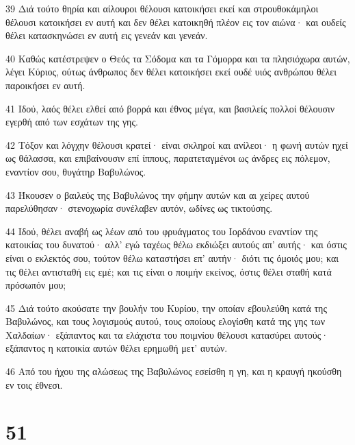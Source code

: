 \par 39 Διά τούτο θηρία και αίλουροι θέλουσι κατοικήσει εκεί και στρουθοκάμηλοι θέλουσι κατοικήσει εν αυτή και δεν θέλει κατοικηθή πλέον εις τον αιώνα· και ουδείς θέλει κατασκηνώσει εν αυτή εις γενεάν και γενεάν.
\par 40 Καθώς κατέστρεψεν ο Θεός τα Σόδομα και τα Γόμορρα και τα πλησιόχωρα αυτών, λέγει Κύριος, ούτως άνθρωπος δεν θέλει κατοικήσει εκεί ουδέ υιός ανθρώπου θέλει παροικήσει εν αυτή.
\par 41 Ιδού, λαός θέλει ελθεί από βορρά και έθνος μέγα, και βασιλείς πολλοί θέλουσιν εγερθή από των εσχάτων της γης.
\par 42 Τόξον και λόγχην θέλουσι κρατεί· είναι σκληροί και ανίλεοι· η φωνή αυτών ηχεί ως θάλασσα, και επιβαίνουσιν επί ίππους, παρατεταγμένοι ως άνδρες εις πόλεμον, εναντίον σου, θυγάτηρ Βαβυλώνος.
\par 43 Ήκουσεν ο βαιλεύς της Βαβυλώνος την φήμην αυτών και αι χείρες αυτού παρελύθησαν· στενοχωρία συνέλαβεν αυτόν, ωδίνες ως τικτούσης.
\par 44 Ιδού, θέλει αναβή ως λέων από του φρυάγματος του Ιορδάνου εναντίον της κατοικίας του δυνατού· αλλ' εγώ ταχέως θέλω εκδιώξει αυτούς απ' αυτής· και όστις είναι ο εκλεκτός σου, τούτον θέλω καταστήσει επ' αυτήν· διότι τις όμοιός μου; και τις θέλει αντισταθή εις εμέ; και τις είναι ο ποιμήν εκείνος, όστις θέλει σταθή κατά πρόσωπόν μου;
\par 45 Διά τούτο ακούσατε την βουλήν του Κυρίου, την οποίαν εβουλεύθη κατά της Βαβυλώνος, και τους λογισμούς αυτού, τους οποίους ελογίσθη κατά της γης των Χαλδαίων· εξάπαντος και τα ελάχιστα του ποιμνίου θέλουσι κατασύρει αυτούς· εξάπαντος η κατοικία αυτών θέλει ερημωθή μετ' αυτών.
\par 46 Από του ήχου της αλώσεως της Βαβυλώνος εσείσθη η γη, και η κραυγή ηκούσθη εν τοις έθνεσι.

\chapter{51}

